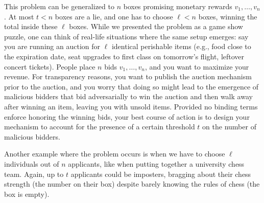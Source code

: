 \documentclass[sigconf,nonacm]{aamas}
\begin{document}
This problem can be generalized to $n$ boxes promising monetary rewards $v_1, \dots, v_n$. At most $t < n$ boxes are a lie, and one has to choose $\ell < n$ boxes, winning the total inside these $\ell$ boxes. While we presented the problem as a game show puzzle, one can think of real-life situations where the same setup emerges: say you are running an auction for $\ell$ identical perishable items (e.g., food close to the expiration date, seat upgrades to first class on tomorrow's flight, leftover concert tickets). People place $n$
bids $v_1, \dots, v_n$, and you want to maximize your revenue. For transparency reasons, you want to publish the auction mechanism prior to the auction, and you worry that doing so might lead to the emergence of malicious bidders that bid adversarially to win the auction and then walk away after winning an item, leaving you with unsold items. Provided no binding terms enforce honoring the winning bids, your best course of action is to design your mechanism to account for the presence of a certain threshold $t$ on the number of malicious bidders.

Another example where the problem occurs is when 
we have to choose 
$\ell$ individuals out of $n$ 
applicants, like when putting together a university chess team. Again, up to $t$ applicants could be imposters, bragging about their chess strength (the number on their box) despite barely knowing the rules of chess (the box is empty).
\end{document}
